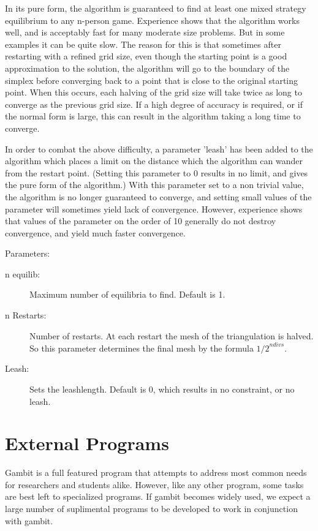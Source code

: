 In its pure form, the algorithm is guaranteed to find at least one
mixed strategy equilibrium to any n-person game.  Experience shows
that the algorithm works well, and is acceptably fast for many
moderate size problems.  But in some examples it can be quite slow.
The reason for this is that sometimes after restarting with a refined
grid size, even though the starting point is a good approximation to
the solution, the algorithm will go to the boundary of the simplex
before converging back to a point that is close to the original
starting point.  When this occurs, each halving of the grid size will
take twice as long to converge as the previous grid size.  If a high
degree of accuracy is required, or if the normal form is large, this
can result in the algorithm taking a long time to converge.

In order to combat the above difficulty, a parameter 'leash' has been
added to the algorithm which places a limit on the distance which the
algorithm can wander from the restart point. (Setting this parameter
to 0 results in no limit, and gives the pure form of the algorithm.)
With this parameter set to a non trivial value, the algorithm is no
longer guaranteed to converge, and setting small values of the
parameter will sometimes yield lack of convergence.  However,
experience shows that values of the parameter on the order of 10
generally do not destroy convergence, and yield much faster
convergence.

Parameters:

\begin{description}
\item[n equilib:] Maximum number of equilibria to find. Default is 1.  
\item[n Restarts:] Number of restarts.  At each restart the mesh of the
triangulation is halved.  So this parameter determines the final mesh
by the formula ${1/2}^{ndivs}$.
\item[Leash:] Sets the leashlength. Default is 0, which results in no
constraint, or no leash.  
\end{description}

\chapter{External Programs}
Gambit is a full featured program that attempts to address most common
needs for researchers and students alike.  However, like any other program,
some tasks are best left to specialized programs.  If gambit becomes widely
used, we expect a large number of suplimental programs to be developed to 
work in conjunction with gambit.

